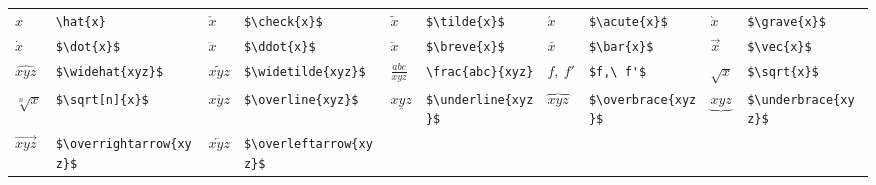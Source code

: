 \documentclass[10pt, english]{article}
\begin{document}
	\begin{center}
		\scriptsize
	\begin{tabular}{ll|ll|ll|ll|ll}
		$\hat{x}$ & \verb|\hat{x}| & $\check{x}$ & \verb|$\check{x}$| & $\tilde{x}$ & \verb|$\tilde{x}$| & $\acute{x}$ & \verb|$\acute{x}$| & $\grave{x}$ & \verb|$\grave{x}$|\\
		$\dot{x}$ & \verb|$\dot{x}$| & $\ddot{x}$ & \verb|$\ddot{x}$| & $\breve{x}$ & \verb|$\breve{x}$| & $\bar{x}$ & \verb|$\bar{x}$| & $\vec{x}$ & \verb|$\vec{x}$|\\
		$\widehat{xyz}$ & \verb|$\widehat{xyz}$| & $\widetilde{xyz}$ & \verb|$\widetilde{xyz}$| & $\frac{abc}{xyz}$ & \verb|\frac{abc}{xyz}| & $f,\ f'$ & \verb|$f,\ f'$| & $\sqrt{x}$ & \verb|$\sqrt{x}$|\\
		$\sqrt[n]{x}$ & \verb|$\sqrt[n]{x}$| & $\overline{xyz}$ & \verb|$\overline{xyz}$| & $\underline{xyz}$ & \verb|$\underline{xyz}$| & $\overbrace{xyz}$ & \verb|$\overbrace{xyz}$| & $\underbrace{xyz}$ & \verb|$\underbrace{xyz}$|\\
		$\overrightarrow{xyz}$ & \verb|$\overrightarrow{xyz}$| & $\overleftarrow{xyz}$ & \verb|$\overleftarrow{xyz}$| \\
	\end{tabular}
	\end{center}
\end{document}
